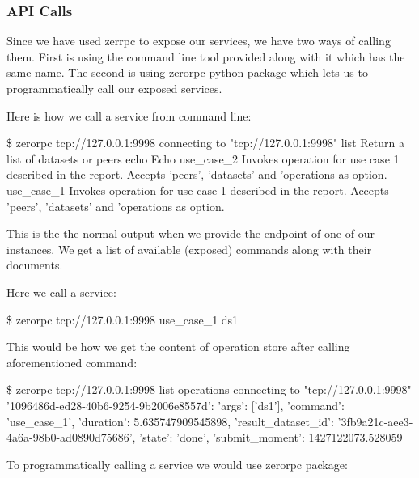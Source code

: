 \subsubsection{API Calls}
Since we have used zerrpc to expose our services, we have two ways of calling them.
First is using the command line tool provided along with it which has the same name.
The second is using zerorpc python package which lets us to programmatically call
our exposed services.

Here is how we call a service from command line:

\begin{python}
\$ zerorpc tcp://127.0.0.1:9998
connecting to "tcp://127.0.0.1:9998"
list             Return a list of datasets or peers
echo             Echo
use_case_2       Invokes operation for use case 1 described in the report. Accepts 'peers', 'datasets' and 'operations as option.
use_case_1       Invokes operation for use case 1 described in the report. Accepts 'peers', 'datasets' and 'operations as option.
\end{python}
This is the the normal output when we provide the endpoint of one of our instances. 
We get a list of available (exposed) commands along with their documents.

Here we call a service:
\begin{python}
\$ zerorpc tcp://127.0.0.1:9998 use_case_1 ds1
\end{python}

This would be how we get the content of operation store after calling aforementioned command:

\begin{python}
\$ zerorpc tcp://127.0.0.1:9998 list operations
connecting to "tcp://127.0.0.1:9998"
{'1096486d-ed28-40b6-9254-9b2006e8557d': {'args': ['ds1'],
                                          'command': 'use_case_1',
                                          'duration': 5.635747909545898,
                                          'result_dataset_id': '3fb9a21c-aee3-4a6a-98b0-ad0890d75686',
                                          'state': 'done',
                                          'submit_moment': 1427122073.528059}}
\end{python}

To programmatically calling a service we would use zerorpc package:

